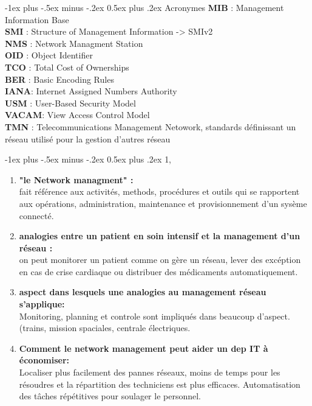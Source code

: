 \documentclass[12pt,landscape]{article}
\makeatletter
\renewcommand{\section}{\@startsection{section}{1}{0mm}%
                                {-1ex plus -.5ex minus -.2ex}%
                                {0.5ex plus .2ex}%
                                {\normalfont\large\bfseries}}
\makeatother
\begin{document}
\begin{multicols}{2}
\section{Acronymes}
\textbf{MIB} : Management Information Base\\
\textbf{SMI} : Structure of Management Information -> SMIv2\\
\textbf{NMS} : Network Managment Station\\
\textbf{OID} : Object Identifier\\
\textbf{TCO} : Total Cost of Ownerships\\
\textbf{BER} : Basic Encoding Rules\\
\textbf{IANA}: Internet Assigned Numbers Authority\\
\textbf{USM} : User-Based Security Model\\
\textbf{VACAM}: View Access Control Model\\
\textbf{TMN} : Telecommunications Management Netowork, standards définissant un réseau utilisé pour la gestion d'autres réseau


\section{1,}
\begin{enumerate}
\item \textbf{"le Network managment" :}\\
fait référence aux activités, methods, procédures et outils qui se rapportent aux opérations, administration, maintenance et provisionnement d'un sysème connecté.

\item \textbf{analogies entre un patient en soin intensif et la management d'un réseau :}\\
on peut monitorer un patient comme on gère un réseau, lever des excéption en cas de crise cardiaque ou distribuer des médicaments automatiquement.

\item \textbf{aspect dans lesquels une analogies au management réseau s'applique:}\\
Monitoring, planning et controle sont impliqués dans beaucoup d'aspect.(trains, mission spaciales, centrale électriques.

\item \textbf{Comment le network management peut aider un dep IT à économiser:}\\
Localiser plus facilement des pannes réseaux, moins de temps pour les résoudres et la répartition des techniciens est plus efficaces. Automatisation des tâches répétitives pour soulager le personnel.


\end{enumerate}
\end{multicols}
\end{document}

